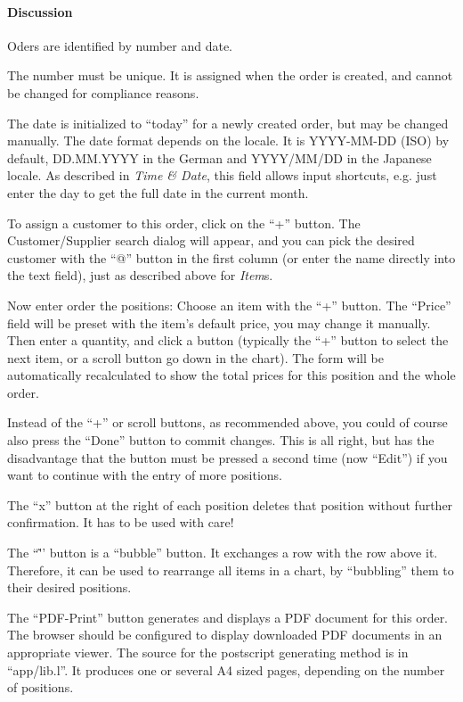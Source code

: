 \paragraph{Discussion}
\label{sec:appl-devel-order-discussion}

Oders are identified by number and date.

The number must be unique. It is assigned when the order is created, and
cannot be changed for compliance reasons.

The date is initialized to ``today'' for a newly created order, but may be
changed manually. The date format depends on the locale. It is
YYYY-MM-DD (ISO) by default, DD.MM.YYYY in the German and YYYY/MM/DD in
the Japanese locale. As described in \emph{Time \& Date},
this field allows input shortcuts, e.g. just enter the day to get the
full date in the current month.

To assign a customer to this order, click on the ``+'' button. The
Customer/Supplier search dialog will appear, and you can pick the
desired customer with the ``@'' button in the first column (or enter the
name directly into the text field), just as described above for
\emph{Item}s.

Now enter order the positions: Choose an item with the ``+'' button. The
``Price'' field will be preset with the item's default price, you may
change it manually. Then enter a quantity, and click a button (typically
the ``+'' button to select the next item, or a scroll button go down in
the chart). The form will be automatically recalculated to show the
total prices for this position and the whole order.

Instead of the ``+'' or scroll buttons, as recommended above, you could of
course also press the ``Done'' button to commit changes. This is all
right, but has the disadvantage that the button must be pressed a second
time (now ``Edit'') if you want to continue with the entry of more
positions.

The ``x'' button at the right of each position deletes that position
without further confirmation. It has to be used with care!

The ``\^'' button is a ``bubble'' button. It exchanges a row with the row
above it. Therefore, it can be used to rearrange all items in a chart,
by ``bubbling'' them to their desired positions.

The ``PDF-Print'' button generates and displays a PDF document for this
order. The browser should be configured to display downloaded PDF
documents in an appropriate viewer. The source for the postscript
generating method is in ``app/lib.l''. It produces one or several A4 sized
pages, depending on the number of positions.


